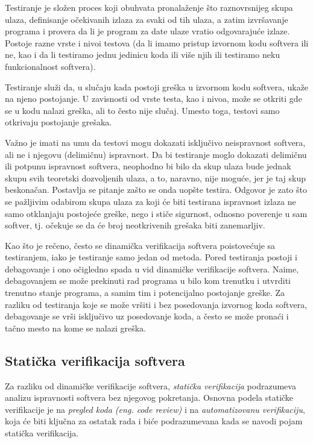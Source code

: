 \documentclass[a4paper]{article}
\theoremstyle{definition}
\begin{document}
{\par Testiranje je složen proces koji obuhvata pronalaženje što raznovrsnijeg skupa ulaza, definisanje očekivanih izlaza za svaki od tih ulaza, a zatim izvršavanje programa i provera da li je program za date ulaze vratio odgovarajuće izlaze. Postoje razne vrste i nivoi testova (da li imamo pristup izvornom kodu softvera ili ne, kao i da li testiramo jednu jedinicu koda ili više njih ili testiramo neku funkcionalnost softvera).

\par Testiranje služi da, u slučaju kada postoji greška u izvornom kodu softvera, ukaže na njeno postojanje. U zavisnosti od vrste testa, kao i nivoa, može se otkriti gde se u kodu nalazi greška, ali to često nije slučaj. Umesto toga, testovi samo otkrivaju postojanje grešaka.

\par Važno je imati na umu da testovi mogu dokazati isključivo neispravnost softvera, ali ne i njegovu (delimičnu) ispravnost. Da bi testiranje moglo dokazati delimičnu ili potpunu ispravnost softvera, neophodno bi bilo da skup ulaza bude jednak skupu svih teoretski dozvoljenih ulaza, a to, naravno, nije moguće, jer je taj skup beskonačan. Postavlja se pitanje zašto se onda uopšte testira. Odgovor je zato što se pažljivim odabirom skupa ulaza za koji će biti testirana ispravnost izlaza ne samo otklanjaju postojeće greške, nego i stiče sigurnost, odnosno poverenje u sam softver, tj. očekuje se da će broj neotkrivenih grešaka biti zanemarljiv.

\par Kao što je rečeno, često se dinamička verifikacija softvera poistovećuje sa testiranjem, iako je testiranje samo jedan od metoda. Pored testiranja postoji i debagovanje i ono očigledno spada u vid dinamičke verifikacije softvera. Naime, debagovanjem se može prekinuti rad programa u bilo kom trenutku i utvrditi trenutno stanje programa, a samim tim i potencijalno postojanje greške. Za razliku od testiranja koje se može vršiti i bez posedovanja izvornog koda softvera, debagovanje se vrši isključivo uz posedovanje koda, a često se može pronaći i tačno mesto na kome se nalazi greška.

\subsection{Statička verifikacija softvera}
\label{subsec:staticka}

\par Za razliku od dinamičke verifikacije softvera, \textit{statička verifikacija} podrazumeva analizu ispravnosti softvera bez njegovog pokretanja. Osnovna podela statičke verifikacije je na \textit{pregled koda (eng. code review)} i na \textit{automatizovanu verifikaciju}, koja će biti ključna za ostatak rada i biće podrazumevana kada se navodi pojam statička verifikacija.

}
\end{document}
